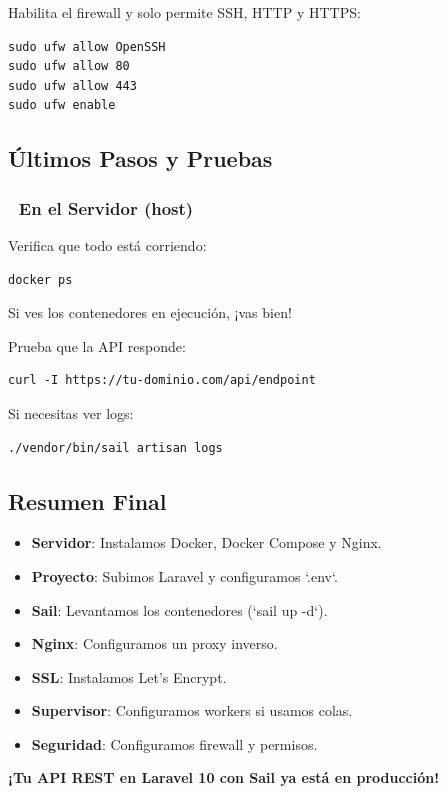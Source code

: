 \documentclass[11pt]{article}
\begin{document}
Habilita el firewall y solo permite SSH, HTTP y HTTPS:

\begin{verbatim}
sudo ufw allow OpenSSH
sudo ufw allow 80
sudo ufw allow 443
sudo ufw enable
\end{verbatim}

\subsection{Últimos Pasos y Pruebas}
\label{sec:org686f978}

\subsubsection*{🔹 En el Servidor (host)}
\label{sec:orga8cb73c}
Verifica que todo está corriendo:

\begin{verbatim}
docker ps
\end{verbatim}

Si ves los contenedores en ejecución, ¡vas bien!

Prueba que la API responde:

\begin{verbatim}
curl -I https://tu-dominio.com/api/endpoint
\end{verbatim}

Si necesitas ver logs:

\begin{verbatim}
./vendor/bin/sail artisan logs
\end{verbatim}

\subsection{Resumen Final}
\label{sec:org05a8fa0}
\begin{itemize}
\item \textbf{\textbf{Servidor}}: Instalamos Docker, Docker Compose y Nginx.
\item \textbf{\textbf{Proyecto}}: Subimos Laravel y configuramos `.env`.
\item \textbf{\textbf{Sail}}: Levantamos los contenedores (`sail up -d`).
\item \textbf{\textbf{Nginx}}: Configuramos un proxy inverso.
\item \textbf{\textbf{SSL}}: Instalamos Let's Encrypt.
\item \textbf{\textbf{Supervisor}}: Configuramos workers si usamos colas.
\item \textbf{\textbf{Seguridad}}: Configuramos firewall y permisos.
\end{itemize}

\textbf{\textbf{¡Tu API REST en Laravel 10 con Sail ya está en producción!}}
\end{document}
